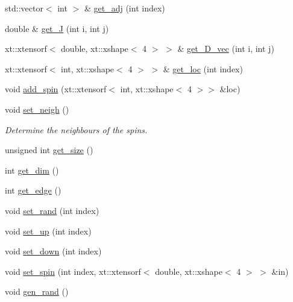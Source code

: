 \begin{DoxyCompactItemize}
\item 
std\+::vector$<$ int $>$ \& \hyperlink{classparticle_1_1field_1_1field__type_a71b567d43943ca9a186c30cfe1abd0e4}{get\+\_\+adj} (int index)
\item 
double \& \hyperlink{classparticle_1_1field_1_1field__type_aeace7d2b757b34b941c598ce929c45a5}{get\+\_\+J} (int i, int j)
\item 
xt\+::xtensorf$<$ double, xt\+::xshape$<$ 4 $>$ $>$ \& \hyperlink{classparticle_1_1field_1_1field__type_ad722f01398113f966942bf1da7342b4b}{get\+\_\+\+D\+\_\+vec} (int i, int j)
\item 
xt\+::xtensorf$<$ int, xt\+::xshape$<$ 4 $>$ $>$ \& \hyperlink{classparticle_1_1field_1_1field__type_a3fde4fed9adefe64fa39474a7ffbf4eb}{get\+\_\+loc} (int index)
\item 
void \hyperlink{classparticle_1_1field_1_1field__type_aa200986c374b75af35f1a9a19c31861b}{add\+\_\+spin} (xt\+::xtensorf$<$ int, xt\+::xshape$<$ 4 $>$$>$ \&loc)
\item 
void \hyperlink{classparticle_1_1field_1_1field__type_a9cd7af012cad435d86a8b80be4fe7b1f}{set\+\_\+neigh} ()
\begin{DoxyCompactList}\small\item\em Determine the neighbours of the spins. \end{DoxyCompactList}\item 
unsigned int \hyperlink{classparticle_1_1field_1_1field__type_a6dfe245d4d52d1445e8088e8ba2d2149}{get\+\_\+size} ()
\item 
int \hyperlink{classparticle_1_1field_1_1field__type_aae85188d550f097c450bf8ab2f64c7f4}{get\+\_\+dim} ()
\item 
int \hyperlink{classparticle_1_1field_1_1field__type_a0668acfd198f8b8deef94d24869a20c0}{get\+\_\+edge} ()
\item 
void \hyperlink{classparticle_1_1field_1_1field__type_af58cf7684adf342fab4fc0451f876b31}{set\+\_\+rand} (int index)
\item 
void \hyperlink{classparticle_1_1field_1_1field__type_aa7afb8939edfbad8d4fdc8c2b13d2c09}{set\+\_\+up} (int index)
\item 
void \hyperlink{classparticle_1_1field_1_1field__type_a96dffd1af9e4055a1fab081ddfc3351b}{set\+\_\+down} (int index)
\item 
void \hyperlink{classparticle_1_1field_1_1field__type_aed2e6a65c7a0d4af0d5000bdb5c4df87}{set\+\_\+spin} (int index, xt\+::xtensorf$<$ double, xt\+::xshape$<$ 4 $>$ $>$ \&in)
\item 
void \hyperlink{classparticle_1_1field_1_1field__type_a3cc84c12d27dd0884235de6682647d33}{gen\+\_\+rand} ()
$$
\end{DoxyCompactItemize}
